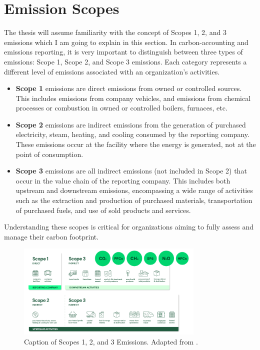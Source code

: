 \section{Emission Scopes}
The thesis will assume familiarity with the concept of Scopes 1, 2, and 3 emissions which I am going to explain in this section. In carbon-accounting and emissions reporting, it is very important to distinguish between three types of emissions: Scope 1, Scope 2, and Scope 3 emissions. Each category represents a different level of emissions associated with an organization's activities. 

\begin{itemize}
    \item \textbf{Scope 1} emissions are direct emissions from owned or controlled sources. This includes emissions from company vehicles, and emissions from chemical processes or combustion in owned or controlled boilers, furnaces, etc.
    \item \textbf{Scope 2} emissions are indirect emissions from the generation of purchased electricity, steam, heating, and cooling consumed by the reporting company. These emissions occur at the facility where the energy is generated, not at the point of consumption.
    \item \textbf{Scope 3} emissions are all indirect emissions (not included in Scope 2) that occur in the value chain of the reporting company. This includes both upstream and downstream emissions, encompassing a wide range of activities such as the extraction and production of purchased materials, transportation of purchased fuels, and use of sold products and services.
\end{itemize}

\noindent Understanding these scopes is critical for organizations aiming to fully assess and manage their carbon footprint.

\begin{figure}[h]
    \centering
    \includegraphics[width=0.8\textwidth]{figures/emission_scopes.png}
    \caption{Caption of Scopes 1, 2, and 3 Emissions. Adapted from \cite{Bernoville2022Scopes}.}
    \label{fig:emission_scopes}
\end{figure}



